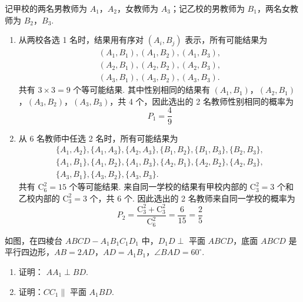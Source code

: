 \begin{solution}
记甲校的两名男教师为 \(A_1\)，\(A_2\)，女教师为 \(A_3\)；记乙校的男教师为 \(B_1\)，两名女教师为 \(B_2\)，\(B_3\).

\begin{enumerate}
\item 从两校各选 1 名时，结果用有序对 \((A_i,B_j)\) 表示，所有可能结果为
\[
\begin{gathered}
(A_1,B_1),(A_1,B_2),(A_1,B_3),\\
(A_2,B_1),(A_2,B_2),(A_2,B_3),\\
(A_3,B_1),(A_3,B_2),(A_3,B_3).
\end{gathered}
\]
共有 \(3\times3=9\) 个等可能结果. 其中性别相同的结果有 \((A_1,B_1)\)，\((A_2,B_1)\)，\((A_3,B_2)\)，\((A_3,B_3)\)，共 4 个，因此选出的 2 名教师性别相同的概率为
\[
P_1=\frac{4}{9}
\]

\item 从 6 名教师中任选 2 名时，所有可能结果为
\[
\begin{gathered}
\{A_1,A_2\},\{A_1,A_3\},\{A_2,A_3\},\{B_1,B_2\},\{B_1,B_3\},\{B_2,B_3\},\\
\{A_1,B_1\},\{A_1,B_2\},\{A_1,B_3\},\{A_2,B_1\},\{A_2,B_2\},\{A_2,B_3\},\\
\{A_3,B_1\},\{A_3,B_2\},\{A_3,B_3\}.
\end{gathered}
\]
共有 \(\mathrm C_6^2=15\) 个等可能结果. 来自同一学校的结果有甲校内部的 \(\mathrm C_3^2=3\) 个和乙校内部的 \(\mathrm C_3^2=3\) 个，共 6 个. 因此选出的 2 名教师来自同一学校的概率为
\[
P_2=\frac{\mathrm C_3^2+\mathrm C_3^2}{\mathrm C_6^2}=\frac{6}{15}=\frac{2}{5}
\]
\end{enumerate}
\end{solution}

\begin{problem}
如图，在四棱台 \(ABCD - A_{1}B_{1}C_{1}D_{1}\) 中，\(D_{1}D \perp\) 平面 \(ABCD\)，底面 \(ABCD\) 是平行四边形，\(AB = 2AD\)，\(AD = A_{1}B_{1}\)，\(\angle BAD = 60^{\circ}\).
\begin{enumerate}
\item 证明： \(AA_{1} \perp BD\).
\item 证明：\(CC_{1} \parallel\) 平面 \(A_{1}BD\).
\end{enumerate}

\end{problem}

